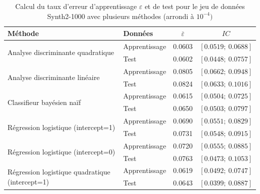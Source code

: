 \documentclass{article}
\begin{document}
\begin{table}[H]
\centering
\caption{Calcul du taux d'erreur d'apprentissage $\varepsilon$ et de test pour le jeu de données Synth2-1000 avec plusieurs méthodes (arrondi à $10^{-4})$}
\begin{tabular}{l|l|cc}
\multicolumn{1}{l|}{\textbf{Méthode}}    & \textbf{Données} &$ \overline{\varepsilon}$ & $IC$                      \\ \hline
\multirow{2}{*}{Analyse discriminante quadratique} & Apprentissage    & 0.0603                   & $\left[0.0519 ;~ 0.0688 \right]$  \\
                                       & Test             & 0.0602             & $\left[0.0448  ;~ 0.0757 \right]$ \\ \hline
\multirow{2}{*}{Analyse discriminante linéaire}                  & Apprentissage & 0.0805                                & $\left[0.0662 ;~ 0.0948 \right]$  \\
                                       & Test             & 0.0824                      & $\left[0.0633  ;~ 0.1016 \right]$ \\ \hline
\multirow{2}{*}{Classifieur bayésien naïf}                  & Apprentissage    & 0.0615                            & $\left[0.0504 ;~ 0.0725 \right]$  \\
                                       & Test             & 0.0650                                & $\left[ 0.0503 ;~ 0.0797 \right]$ \\ \hline
\multirow{2}{*}{Régression logistique (intercept=1)}                  & Apprentissage    & 0.0690                           & $\left[0.0551 ;~ 0.0829 \right]$  \\
                                       & Test             & 0.0731                                 & $\left[0.0548;~ 0.0915 \right]$ \\ \hline
\multirow{2}{*}{Régression logistique (intercept=0)}                  & Apprentissage    & 0.0720                             & $\left[0.0555 ;~ 0.0885\right]$  \\
                                       & Test             & 0.0763                                 & $\left[0.0473 ;~ 0.1053 \right]$ \\ \hline
\multirow{2}{*}{Régression logistique quadratique (intercept=1)}                  & Apprentissage    & 0.0619                             & $\left[0.0492 ;~ 0.0747 \right]$  \\
                                       & Test             & 0.0643                                 & $\left[0.0399;~ 0.0887 \right]$ \\ \hline

\end{tabular}
\end{table}
\end{document}
